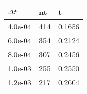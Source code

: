 \begin{tabular}{lll}
$\Delta t$ & nt & t \\ 
\hline 
4.0e-04 & 414 & 0.1656 \\ 
6.0e-04 & 354 & 0.2124 \\ 
8.0e-04 & 307 & 0.2456 \\ 
1.0e-03 & 255 & 0.2550 \\ 
1.2e-03 & 217 & 0.2604 \\ 
\hline 
\end{tabular}